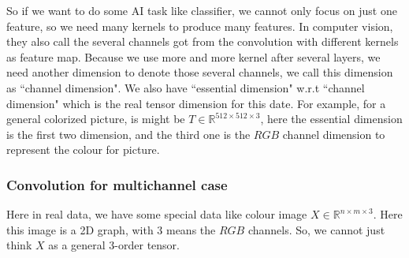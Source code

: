 So if we want to do some AI task like classifier, we cannot only focus on just one feature, so we need many kernels to produce many features. In computer vision, they also call the several channels got from the convolution with different kernels as feature map.  
Because we use more and more kernel after several layers, we need another dimension to denote those several channels, we call this dimension as ``channel dimension". We also have ``essential dimension" w.r.t ``channel dimension" which is the real tensor dimension for this date. For example, for a general colorized picture, is might be $T \in \mathbb{R}^{512\times 512 \times 3}$, here the essential dimension is the first two dimension, and the third one is the $RGB$ channel dimension to represent the colour for picture. 



\subsubsection{Convolution for multichannel case}
Here in real data, we have some special data like colour image $X \in \mathbb{R}^{n \times m \times3}$. Here this image is a 2D graph, with $3$ means the $RGB$ channels. So, we cannot just think $X$ as a general $3$-order tensor. 

